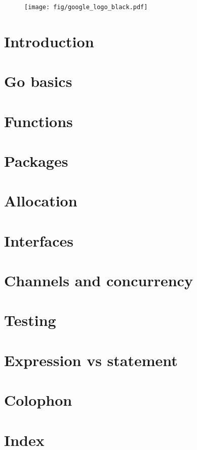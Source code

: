 \documentclass[a4paper,twoside]{blocksbook}
\begin{document}
\newpage
{}
\tableofcontents
\lstlistoflistings
\listoffigures
\listoftables
\listofex

\clearpage
\thispagestyle{empty}
\begin{figure}
\begin{center}
\texttt{[image: fig/google\_logo\_black.pdf]}
\end{center}
\end{figure}

\chapter{Introduction}
\label{chap:intro}


\chapter{Go basics}
\label{chap:basics}


\chapter{Functions}
\label{chap:functions}


\chapter{Packages}
\label{chap:packages}


\chapter{Allocation}
\label{chap:allocation}


\chapter{Interfaces}
\label{chap:interfaces}


\chapter{Channels and concurrency}
\label{chap:channels}


\chapter{Testing}
\label{chap:testing}

\appendix
\chapter{Expression vs statement}


\chapter{Colophon}


\chapter{Index}
\printindex


\end{document}

